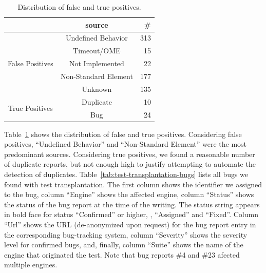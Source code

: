 \documentclass[10pt,conference,anonymous]{IEEEtran}
\begin{document}
\begin{table}[h!]
  \setlength{\tabcolsep}{4pt}    
  \centering
  \caption{\label{fig:falsepositives}\label{fig:truepositives}\label{fig:piecharts-transplantation}Distribution of false and true positives.}
  \begin{tabular}{ccr}
    \toprule
    & source &  \#\\
    \midrule
    \multirow{5}{*}{False Positives} & Undefined Behavior & 313 \\
    & Timeout/OME & 15 \\
    & Not Implemented & 22 \\
    & Non-Standard Element & 177 \\
    & Unknown & 135 \\
    \midrule
    \multirow{2}{*}{True Positives} & Duplicate & 10 \\
    & Bug & 24 \\
    \bottomrule
  \end{tabular}
\end{table}






Table~\ref{fig:piecharts-transplantation} shows the distribution of
false and true positives. Considering false positives, ``Undefined
Behavior'' and ``Non-Standard Element'' were the most predominant
sources. Considering true positives, we found a reasonable number of
duplicate reports, but not enough high to justify attempting to
automate the detection of duplicates.
Table~\ref{tab:test-transplantation-bugs} lists all bugs we found with
test transplantation. The first column shows the identifier we
assigned to the bug, column ``Engine'' shows the
affected engine, column ``Status'' shows the status of the bug report
at the time of the writing. The status string appears in bold face for
status ``Confirmed'' or higher, \ie{}, ``Assigned'' and ``Fixed''.
Column ``Url'' shows the URL (de-anonymized upon request) for the bug
report entry in the corresponding bug-tracking system, column
``Severity'' shows the severity level for confirmed bugs, and,
finally, column ``Suite'' shows the name of the engine that originated
the test. Note that bug reports \#4 and \#23 afected multiple
engines. 
\end{document}
